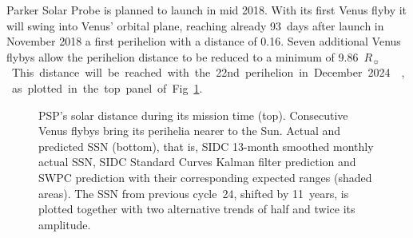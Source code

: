 \documentclass[]{aa}
\newcommand{\Rs}{$R_\sun{}$}
\begin{document}
	Parker Solar Probe is planned to launch in mid 2018. With its first Venus flyby it will swing into Venus' orbital plane, reaching already 93~days after launch in November 2018 a first perihelion with a distance of \SI{0.16}{\au}. Seven additional Venus flybys allow the perihelion distance to be reduced to a minimum of \SI{9.86}{\Rs}. This distance will be reached with the 22nd perihelion in December 2024 \citep{Fox2015}, as plotted in the top panel of Fig.~\ref{fig:SPP_orbit_predicted_SSN_overview_f_plot}.
	\begin{figure}
		\caption{PSP's solar distance during its mission time (top). Consecutive Venus flybys bring its perihelia nearer to the Sun. Actual and predicted SSN (bottom), that is, SIDC 13-month smoothed monthly actual SSN, SIDC Standard Curves Kalman filter prediction and SWPC prediction with their corresponding expected ranges (shaded areas). The SSN from previous cycle~24, shifted by 11~years, is plotted together with two alternative trends of half and twice its amplitude.}
		\label{fig:SPP_orbit_predicted_SSN_overview_f_plot}
	\end{figure}
\end{document}
